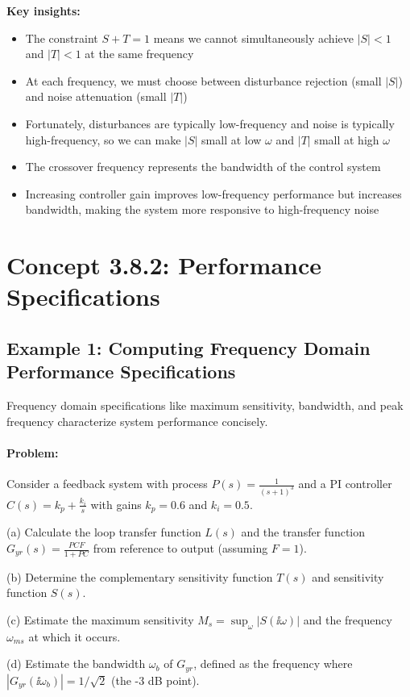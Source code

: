 \documentclass[11pt,a4paper]{article}
\begin{document}
\textbf{Key insights:}
\begin{itemize}
\item The constraint $S + T = 1$ means we cannot simultaneously achieve $|S| < 1$ and $|T| < 1$ at the same frequency
\item At each frequency, we must choose between disturbance rejection (small $|S|$) and noise attenuation (small $|T|$)
\item Fortunately, disturbances are typically low-frequency and noise is typically high-frequency, so we can make $|S|$ small at low $\omega$ and $|T|$ small at high $\omega$
\item The crossover frequency represents the bandwidth of the control system
\item Increasing controller gain improves low-frequency performance but increases bandwidth, making the system more responsive to high-frequency noise
\end{itemize}

\section{Concept 3.8.2: Performance Specifications}

\subsection{Example 1: Computing Frequency Domain Performance Specifications}

Frequency domain specifications like maximum sensitivity, bandwidth, and peak frequency characterize system performance concisely.

\paragraph{Problem:} 
Consider a feedback system with process $P(s) = \frac{1}{(s+1)^3}$ and a PI controller $C(s) = k_p + \frac{k_i}{s}$ with gains $k_p = 0.6$ and $k_i = 0.5$.

(a) Calculate the loop transfer function $L(s)$ and the transfer function $G_{yr}(s) = \frac{PCF}{1+PC}$ from reference to output (assuming $F = 1$).

(b) Determine the complementary sensitivity function $T(s)$ and sensitivity function $S(s)$.

(c) Estimate the maximum sensitivity $M_s = \sup_\omega |S(\ii\omega)|$ and the frequency $\omega_{ms}$ at which it occurs.

(d) Estimate the bandwidth $\omega_b$ of $G_{yr}$, defined as the frequency where $|G_{yr}(\ii\omega_b)| = 1/\sqrt{2}$ (the -3 dB point).
\end{document}
